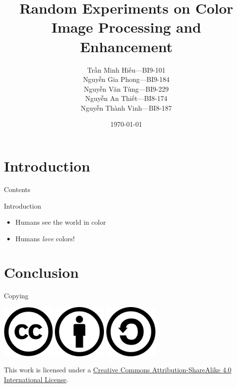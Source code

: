 \documentclass[pdf]{beamer}
\title[RECIPE]{Random Experiments on Color Image Processing and Enhancement}
\author[Group 8]{Trần Minh Hiếu---BI9-101\\
                 Nguyễn Gia Phong---BI9-184\\
                 Nguyễn Văn Tùng---BI9-229\\
                 Nguyễn An Thiết---BI8-174\\
                 Nguyễn Thành Vinh---BI8-187}
\institute{University of Science and Technology of Hà Nội}
\date{\selectlanguage{english}\today}
\begin{document}
\frame{\titlepage}
\section{Introduction}
\begin{frame}{Contents}
  \tableofcontents
\end{frame}
\begin{frame}{Introduction}
  \begin{itemize}\Large
    \item Humans see the world in color
    \item Humans \emph{love} colors!
  \end{itemize}
\end{frame}

\section{Conclusion}
\frame{\tableofcontents[currentsection]}
\begin{frame}{Copying}\Large
  \begin{center}
    \includegraphics[width=0.2\textwidth]{CC.png}
    \includegraphics[width=0.2\textwidth]{BY.png}
    \includegraphics[width=0.2\textwidth]{SA.png}
  \end{center}

  This work is licensed under a
  \href{https://creativecommons.org/licenses/by-sa/4.0/}{Creative Commons
  Attribution-ShareAlike 4.0 International License}.
\end{frame}
\end{document}

